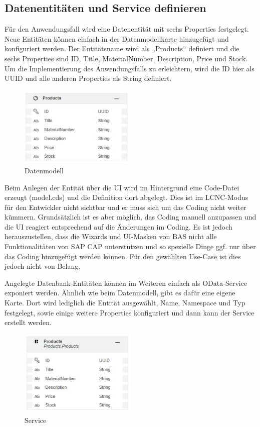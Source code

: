 \subsection{Datenentitäten und Service definieren}
Für den Anwendungsfall wird eine Datenentität mit sechs Properties festgelegt. Neue Entitäten können einfach in der Datenmodellkarte hinzugefügt und konfiguriert werden. Der Entitätsname wird als „Products“ definiert und die sechs Properties sind ID, Title, MaterialNumber, Description, Price und Stock. Um die Implementierung des Anwendungsfalls zu erleichtern, wird die ID hier als UUID und alle anderen Properties als String definiert.

\begin{figure}[htbp]
 \centering
 \includegraphics[width=0.5\textwidth]{Bilder/fiori_element/3_4_Data_Model.JPG}
 \caption{Datenmodell}
\end{figure}

Beim Anlegen der Entität über die UI wird im Hintergrund eine Code-Datei erzeugt (model.cds) und die Definition dort abgelegt. Dies ist im LCNC-Modus für den Entwickler nicht sichtbar und er muss sich um das Coding nicht weiter kümmern. Grundsätzlich ist es aber möglich, das Coding manuell anzupassen und die UI reagiert entsprechend auf die Änderungen im Coding. Es ist jedoch herauszustellen, dass die Wizards und UI-Masken von BAS nicht alle Funktionalitäten von SAP CAP unterstützen und so spezielle Dinge ggf. nur über das Coding hinzugefügt werden können. Für den gewählten Use-Case ist dies jedoch nicht von Belang.

Angelegte Datenbank-Entitäten können im Weiteren einfach als OData-Service exponiert werden. Ähnlich wie beim Datenmodell, gibt es dafür eine eigene Karte. Dort wird lediglich die Entität ausgewählt, Name, Namespace und Typ festgelegt, sowie einige weitere Properties konfiguriert und dann kann der Service erstellt werden.

\begin{figure}[htbp]
 \centering
 \includegraphics[width=0.5\textwidth]{Bilder/fiori_element/3_5_Service.JPG}
 \caption{Service}
\end{figure}

